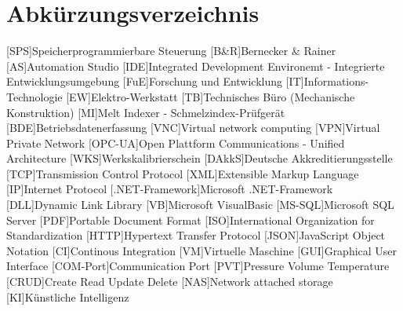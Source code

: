 \chapter*{Abkürzungsverzeichnis}
\begin{acronym}
    [SPS]{Speicherprogrammierbare Steuerung}
    [B\&R]{Bernecker \& Rainer}
    [AS]{Automation Studio}
    [IDE]{Integrated Development Environemt - Integrierte Entwicklungsumgebung}
    [FuE]{Forschung und Entwicklung}
    [IT]{Informations-Technologie}
    [EW]{Elektro-Werkstatt}
    [TB]{Technisches Büro (Mechanische Konstruktion)}
    [MI]{Melt Indexer - Schmelzindex-Prüfgerät}
    [BDE]{Betriebsdatenerfassung}
    [VNC]{Virtual network computing}
    [VPN]{Virtual Private Network}
    [OPC-UA]{Open Plattform Communications - Unified Architecture}
    [WKS]{Werkskalibrierschein}
    [DAkkS]{Deutsche Akkreditierungsstelle}
    [TCP]{Transmission Control Protocol}
    [XML]{Extensible Markup Language}
    [IP]{Internet Protocol}
    [.NET-Framework]{Microsoft .NET-Framework}
    [DLL]{Dynamic Link Library}
    [VB]{Microsoft VisualBasic}
    [MS-SQL]{Microsoft SQL Server}
    [PDF]{Portable Document Format}
    [ISO]{International Organization for Standardization}
    [HTTP]{Hypertext Transfer Protocol}
    [JSON]{JavaScript Object Notation}
    [CI]{Continous Integration}
    [VM]{Virtuelle Maschine}
    [GUI]{Graphical User Interface}
    [COM-Port]{Communication Port}
    [PVT]{Pressure Volume Temperature}
    [CRUD]{Create Read Update Delete}
    [NAS]{Network attached storage}
    [KI]{Künstliche Intelligenz}
\end{acronym}